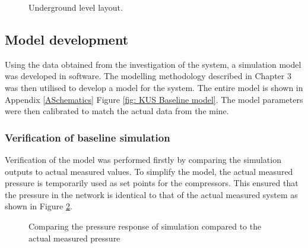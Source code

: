 	\begin{figure}[h!]
		\centering
		\caption{Underground level layout.}
		\label{fig: KUS Underground level layout}
	\end{figure}	
	\subsection{Model development}
	
	Using the data obtained from the investigation of the system, a  simulation model was developed in software. The modelling methodology described in Chapter 3 was then utilised to develop a model for the system. The entire model is shown in Appendix \ref{ASchematics} Figure \ref{fig: KUS Baseline model}. The model parameters were then calibrated to match the actual data from the mine.
	
	\subsubsection{Verification of baseline simulation}
	Verification of the model was performed firstly by comparing the simulation outputs to actual measured values. To simplify the model, the actual measured pressure is temporarily used as set points for the compressors. This ensured that the pressure in the network is identical to that of the actual measured system as shown in Figure \ref{fig: Verification Pressure kusasalethu}.
	\par 
	
	\begin{figure}[h]
		\centering
		\fbox{}
		\caption{Comparing the pressure response of simulation compared to the actual measured pressure}
		\label{fig: Verification Pressure kusasalethu}
	\end{figure}

